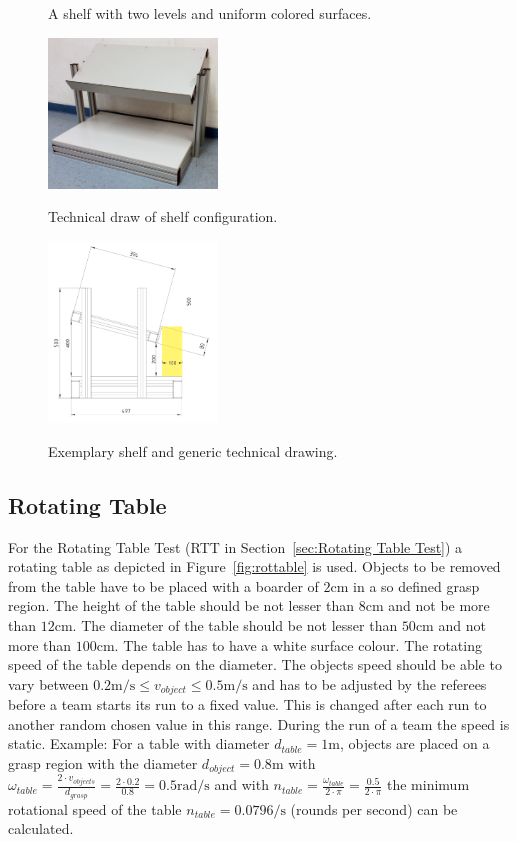 \begin{figure}[h!]
\centering

\caption{A shelf with two levels and uniform colored surfaces.}{%
  \includegraphics[width=0.4\textwidth ]{./images/shelf.jpg}%
}%

\caption{Technical draw of shelf configuration.}{%
  \includegraphics[width=0.4\textwidth ]{./images/shelfUpdate.pdf}%
}
\caption{Exemplary shelf and generic technical drawing.}%
\label{fig:shelf}
\end{figure}


\subsection{Rotating Table}\label{sec:Rotating Table}
For the Rotating Table Test (RTT in Section~\ref{sec:Rotating Table Test}) a rotating table as depicted in Figure~\ref{fig:rottable} is used. 
Objects to be removed from the table have to be placed with a boarder of $2\si{\centi\meter}$ in a so defined grasp region. The height of the table should be not lesser than $8\si{\centi\meter}$ and not be more than $12\si{\centi\meter}$. The diameter of the table should be not lesser than $50\si{\centi\meter}$ and not more than $100\si{\centi\meter}$. The table has to have a white surface colour. The rotating speed of the table depends on the diameter. The objects speed should be able to vary between $0.2 \si{\meter\per\second} \le v_{object} \le 0.5 \si{\meter\per\second}$ and has to be adjusted by the referees before a team starts its run to a fixed value. This is changed after each run to another random chosen value in this range. During the run of a team the speed is static. Example: For a table with diameter $d_{table}=1\si{\meter}$, objects are placed on a grasp region with the diameter $d_{object}=0.8\si{\meter}$ with $\omega_{table} = \frac{2 \cdot v_{objects} }{d_{grasp}}=\frac{2 \cdot 0.2}{0.8}=0.5\si{\radian\per\second}$ and with $n_{table}=\frac{\omega_{table}}{2 \cdot \pi}=\frac{0.5}{2 \cdot \pi}$ the minimum rotational speed of the table $n_{table}= 0.0796 \si{\per\second}$ (rounds per second) can be calculated.  


